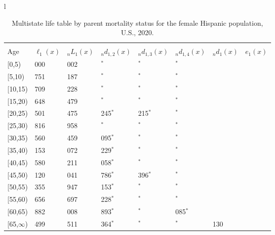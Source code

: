 \documentclass[
]{article}
\begin{document}
\begin{table}
\caption{\label{tab:table-hispanic-female}Multistate life table by parent mortality status for the female Hispanic population, U.S., 2020.}

\centering
\fontsize{9}{11}\selectfont
\begin{tabular}[t]{l}
\hline
\begin{tabular}{>{\raggedright\arraybackslash}p{.45in}>{\raggedleft\arraybackslash}p{.65in}>{\raggedleft\arraybackslash}p{.65in}>{\raggedleft\arraybackslash}p{.65in}>{\raggedleft\arraybackslash}p{.65in}>{\raggedleft\arraybackslash}p{.65in}>{\raggedleft\arraybackslash}p{.65in}>{\raggedleft\arraybackslash}p{.65in}}
\toprule
\multicolumn{1}{c}{ } & \multicolumn{7}{c}{(1) Lost neither} \\
\cmidrule(l{3pt}r{3pt}){2-8}
Age & $\ell_{1}(x)$ & ${}_nL_{1}(x)$ & ${}_nd_{1,2}(x)$ & ${}_nd_{1,3}(x)$ & ${}_nd_{1,4}(x)$ & ${}_nd_{1}(x)$ & $e_{1}(x)$\\
\midrule
{}[0,5) & 100 000 & 497 002 & 757$^{*}$ & 0$^{*}$ & 0$^{*}$ & 492 & 45\\
{}[5,10) & 98 751 & 491 187 & 0$^{*}$ & 0$^{*}$ & 0$^{*}$ & 42 & 40\\
{}[10,15) & 98 709 & 483 228 & 0$^{*}$ & 0$^{*}$ & 0$^{*}$ & 61 & 36\\
{}[15,20) & 98 648 & 477 479 & 0$^{*}$ & 0$^{*}$ & 0$^{*}$ & 147 & 31\\
{}[20,25) & 98 501 & 473 475 & 1 245$^{*}$ & 1 215$^{*}$ & 0$^{*}$ & 224 & 26\\
\addlinespace
{}[25,30) & 95 816 & 437 958 & 0$^{*}$ & 0$^{*}$ & 0$^{*}$ & 256 & 21\\
{}[30,35) & 95 560 & 391 459 & 4 095$^{*}$ & 0$^{*}$ & 0$^{*}$ & 312 & 17\\
{}[35,40) & 91 153 & 350 072 & 6 229$^{*}$ & 0$^{*}$ & 0$^{*}$ & 344 & 13\\
{}[40,45) & 84 580 & 297 211 & 2 058$^{*}$ & 0$^{*}$ & 0$^{*}$ & 402 & 9\\
{}[45,50) & 82 120 & 266 041 & 7 786$^{*}$ & 1 396$^{*}$ & 0$^{*}$ & 583 & 6\\
\addlinespace
{}[50,55) & 72 355 & 160 947 & 14 153$^{*}$ & 0$^{*}$ & 0$^{*}$ & 545 & 4\\
{}[55,60) & 57 656 & 104 697 & 3 228$^{*}$ & 0$^{*}$ & 0$^{*}$ & 545 & 2\\
{}[60,65) & 53 882 & 49 008 & 1 893$^{*}$ & 0$^{*}$ & 2 085$^{*}$ & 406 & 1\\
{}[65,$\infty$) & 49 499 & 43 511 & 5 364$^{*}$ & 0$^{*}$ & 0$^{*}$ & 2 130 & 0\\

\end{tabular}
\end{tabular}
\end{table}
\end{document}
